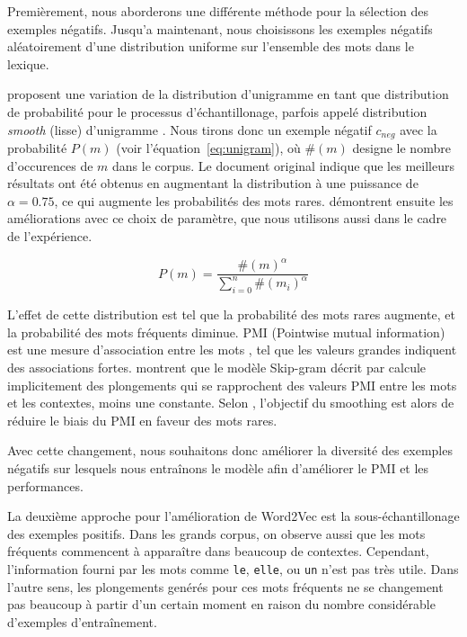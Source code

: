 \documentclass[12pt]{article}
\begin{document}
Premièrement, nous aborderons une différente méthode pour la sélection des exemples négatifs. Jusqu'a maintenant, nous choisissons les exemples négatifs aléatoirement d'une distribution uniforme sur l'ensemble des mots dans le lexique. 

\cite{DBLP:conf/nips/MikolovSCCD13} proposent une variation de la distribution d'unigramme en tant que distribution de probabilité pour le processus d'échantillonage, parfois appelé distribution \textit{smooth} (lisse) d'unigramme \citep{levy2015improving}. Nous tirons donc un exemple négatif $c_{neg}$ avec la probabilité $P(m)$ (voir l'équation~\ref{eq:unigram}), où $\#(m)$ designe le nombre d'occurences de $m$ dans le corpus. Le document original indique que les meilleurs résultats ont été obtenus en augmentant la distribution à une puissance de $\alpha = 0.75$, ce qui augmente les probabilités des mots rares. \cite{levy2015improving} démontrent ensuite les améliorations avec ce choix de paramètre, que nous utilisons aussi dans le cadre de l'expérience.

\begin{equation}\label{eq:unigram}
P(m) = \frac{\#(m)^{\alpha}}{\sum_{i=0}^n \#(m_i)^{\alpha}}
\end{equation}

L'effet de cette distribution est tel que la probabilité des mots rares augmente, et la probabilité des mots fréquents diminue. PMI (Pointwise mutual information) est une mesure d'association entre les mots \citep{jurafsky2000speech}, tel que les valeurs grandes indiquent des associations fortes. \cite{levy2014neural} montrent que le modèle Skip-gram décrit par \cite{DBLP:conf/nips/MikolovSCCD13} calcule implicitement des plongements qui se rapprochent des valeurs PMI entre les mots et les contextes, moins une constante. Selon \cite{levy2015improving}, l'objectif du smoothing est alors de réduire le biais du PMI en faveur des mots rares. 

Avec cette changement, nous souhaitons donc améliorer la diversité des exemples négatifs sur lesquels nous entraînons le modèle afin d'améliorer le PMI et les performances.

La deuxième approche pour l'amélioration de Word2Vec est la sous-échantillonage des exemples positifs. Dans les grands corpus, on observe aussi que les mots fréquents commencent à apparaître dans beaucoup de contextes. Cependant, l'information fourni par les mots comme \texttt{le}, \texttt{elle}, ou \texttt{un} n'est pas très utile. Dans l'autre sens, les plongements genérés pour ces mots fréquents ne se changement pas beaucoup à partir d'un certain moment en raison du nombre considérable d'exemples d'entraînement. 
\end{document}
